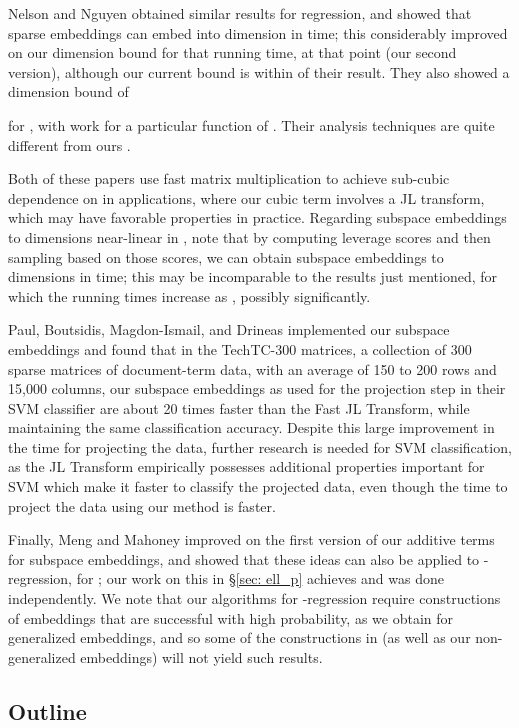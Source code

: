 \documentclass{sig-alternate}
\begin{document}
Nelson and Nguyen obtained similar results for regression, and
showed that sparse embeddings can embed into dimension 
in  time; this considerably improved on our dimension bound for that running time,
at that point (our second version),
although our current bound is within  of their result. They also showed a
dimension bound of

for , with work  for a particular
function of . Their analysis techniques are quite different from ours \cite{NN}.

Both of these papers use fast matrix multiplication to achieve
sub-cubic dependence on  in applications, where our cubic term involves a JL transform,
which may have favorable properties in practice. Regarding subspace embeddings
to dimensions near-linear in , note that by computing leverage scores
and then sampling based on those scores, we can obtain subspace
embeddings to  dimensions in 
time; this may be incomparable to the results just mentioned, for which the running 
times increase as , possibly significantly.

Paul, Boutsidis, Magdon-Ismail, and Drineas \cite{sbmd} implemented 
our subspace embeddings and found that
in the TechTC-300 matrices, a collection of 300 sparse matrices of document-term data, with an 
average of 150 to 200 rows and 15,000 columns, our subspace embeddings as used
for the projection step in their SVM classifier are about 20 times faster than the
Fast JL Transform, while maintaining the same classification accuracy. Despite this
large improvement in the time for projecting the data, further research is needed
for SVM classification, as the JL Transform empirically possesses additional properties important 
for SVM which make it faster to classify the projected data, 
even though the time to project the data using our method is faster. 

Finally, Meng and Mahoney improved on the first version of our additive terms for 
subspace embeddings, and
showed that these ideas can also be applied to -regression, 
for  \cite{MengMahoney}; our work on this in \S\ref{sec: ell_p}
achieves  and was done independently.
We note that our algorithms for -regression require constructions
of embeddings that are successful with high probability, as we obtain
for generalized embeddings, and so some of the constructions in \cite{MP,NN} 
(as well as our non-generalized embeddings) will not yield such  results. 



\subsection{Outline}
\end{document}
